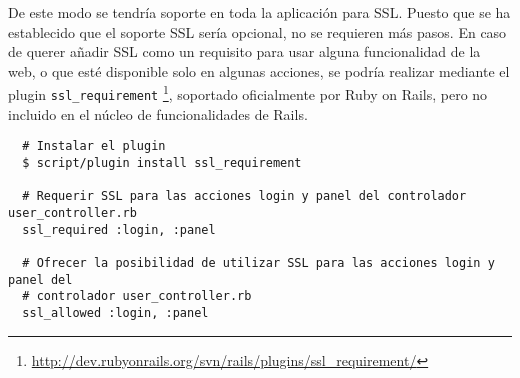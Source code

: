 De este modo se tendría soporte en toda la aplicación para SSL. Puesto que se ha establecido que el soporte SSL sería opcional, no se requieren más pasos. En caso de querer añadir SSL como un requisito para usar alguna funcionalidad de la web, o que esté disponible solo en algunas acciones, se podría realizar mediante el plugin \texttt{ssl\_requirement} \footnote{\url{http://dev.rubyonrails.org/svn/rails/plugins/ssl\_requirement/}}, soportado oficialmente por Ruby on Rails, pero no incluido en el núcleo de funcionalidades de Rails.

\begin{verbatim}
  # Instalar el plugin
  $ script/plugin install ssl_requirement
  
  # Requerir SSL para las acciones login y panel del controlador user_controller.rb
  ssl_required :login, :panel
  
  # Ofrecer la posibilidad de utilizar SSL para las acciones login y panel del
  # controlador user_controller.rb
  ssl_allowed :login, :panel
\end{verbatim}

